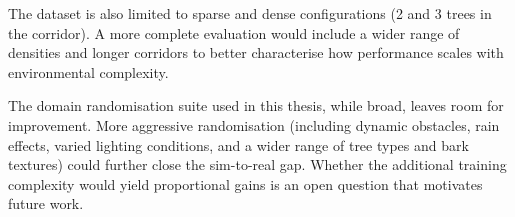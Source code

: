 \documentclass[../main.tex]{subfiles}
\begin{document}
The dataset is also limited to sparse and dense configurations (2 and 3 trees in the corridor). A more complete evaluation would include a wider range of densities and longer corridors to better characterise how performance scales with environmental complexity.

The domain randomisation suite used in this thesis, while broad, leaves room for improvement. More aggressive randomisation (including dynamic obstacles, rain effects, varied lighting conditions, and a wider range of tree types and bark textures) could further close the sim-to-real gap. Whether the additional training complexity would yield proportional gains is an open question that motivates future work.
\end{document}
